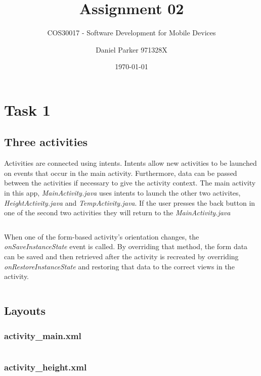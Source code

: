 \documentclass[11pt,english,numbers=endperiod,parskip=half]{scrartcl}
\title{Assignment 02}
\subtitle{COS30017 - Software Development for Mobile Devices}
\author{Daniel Parker 971328X}
\date{\today}
\begin{document}
\maketitle
\thispagestyle{empty}

\section{Task 1}
\subsection{Three activities}
\raggedright
Activities are connected using intents. Intents allow new activities to be launched on events that occur in the main activity. Furthermore, data can be passed between the activities if necessary to give the activity context. The main activity in this app, \textit{MainActivity.java} uses intents to launch the other two activites, \textit{HeightActivity.java} and \textit{TempActivity.java}. If the user presses the back button in one of the second two activities they will return to the \textit{MainActivity.java}

\inputminted[firstline=40,lastline=50]{java}{../../Apps/Converters/app/src/main/java/au/net/danielparker/converters/MainActivity.java}

When one of the form-based activity's orientation changes, the \textit{onSaveInstanceState} event is called. By overriding that method, the form data can be saved and then retrieved after the activity is recreated by overriding \textit{onRestoreInstanceState} and restoring that data to the correct views in the activity.

\inputminted[firstline=37,lastline=58]{java}{../../Apps/Converters/app/src/main/java/au/net/danielparker/converters/HeightActivity.java}

\subsection{Layouts}
\subsubsection{activity\_main.xml}
\inputminted{xml}{../../Apps/Converters/app/src/main/res/layout/activity_main.xml}
\subsubsection{activity\_height.xml}
\inputminted{xml}{../../Apps/Converters/app/src/main/res/layout/activity_height.xml}
\end{document}
